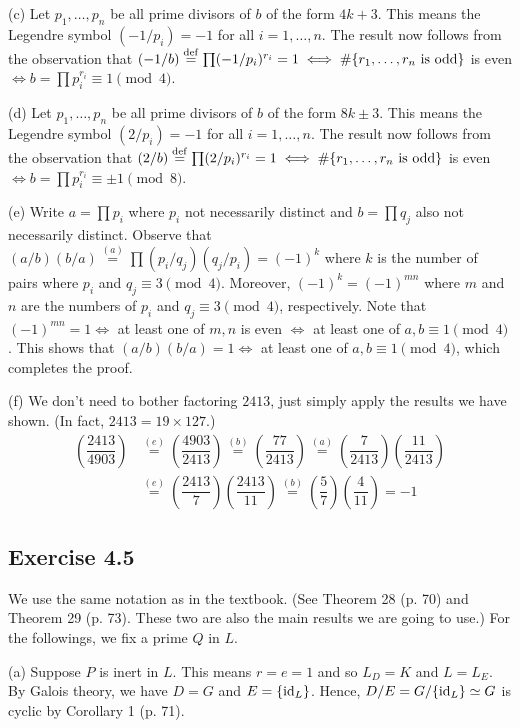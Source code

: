 \documentclass[../Marcus.tex]{subfiles}
\begin{document}
(c) Let $p_1,\ldots,p_n$ be all prime divisors of $b$ of the form $4k+3$. This means the Legendre symbol $(-1/p_i)=-1$ for all $i=1,\ldots,n$. The result now follows from the observation that $(-1/b)\overset{\operatorname{def}}{=}\prod (-1/p_i)^{r_i}=1 \iff \#\{r_1,\ldots,r_n \text{ is odd}\}$ is even $\iff b=\prod p_i^{r_i}\equiv 1\pmod{4}$.

(d) Let $p_1,\ldots,p_n$ be all prime divisors of $b$ of the form $8k\pm3$. This means the Legendre symbol $(2/p_i)=-1$ for all $i=1,\ldots,n$. The result now follows from the observation that $(2/b)\overset{\operatorname{def}}{=}\prod (2/p_i)^{r_i}=1 \iff \#\{r_1,\ldots,r_n \text{ is odd}\}$ is even $\iff b=\prod p_i^{r_i}\equiv \pm1\pmod{8}$.

(e) Write $a=\prod p_i$ where $p_i$ not necessarily distinct and $b=\prod q_j$ also not necessarily distinct. Observe that $(a/b)(b/a)\overset{(a)}{=}\prod (p_i/q_j)(q_j/p_i)=(-1)^k$ where $k$ is the number of pairs where $p_i$ and $q_j\equiv 3\pmod{4}$. Moreover, $(-1)^k=(-1)^{mn}$ where $m$ and $n$ are the numbers of $p_i$ and $q_j\equiv 3\pmod{4}$, respectively. Note that $(-1)^{mn}=1 \iff$ at least one of $m,n$ is even $\iff$ at least one of $a,b\equiv 1\pmod{4}$. This shows that $(a/b)(b/a)=1 \iff$ at least one of $a,b\equiv 1\pmod{4}$, which completes the proof.

(f) We don't need to bother factoring $2413$, just simply apply the results we have shown. (In fact, $2413 = 19\times 127$.)
\begin{align*}
    \left(\dfrac{2413}{4903}\right) &\overset{(e)}{=} \left(\dfrac{4903}{2413}\right) \overset{(b)}{=} \left(\dfrac{77}{2413}\right) \overset{(a)}{=} \left(\dfrac{7}{2413}\right)\left(\dfrac{11}{2413}\right) \\ &\overset{(e)}{=} \left(\dfrac{2413}{7}\right)\left(\dfrac{2413}{11}\right) \overset{(b)}{=} \left(\dfrac{5}{7}\right)\left(\dfrac{4}{11}\right) = -1
\end{align*}

\subsection*{Exercise 4.5}

We use the same notation as in the textbook. (See Theorem 28 (p. 70) and Theorem 29 (p. 73). These two are also the main results we are going to use.) For the followings, we fix a prime $Q$ in $L$.

(a) Suppose $P$ is inert in $L$. This means $r=e=1$ and so $L_D = K$ and $L=L_E$. By Galois theory, we have $D=G$ and $E = \{\operatorname{id}_L\}$. Hence, $D/E=G/\{\operatorname{id}_L\}\simeq G$ is cyclic by Corollary 1 (p. 71).
\end{document}
